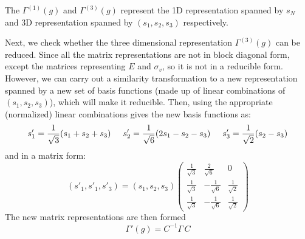 \documentclass[a4paper, 12pt, openany]{report}
\begin{document}
The $\Gamma^{(1)}(g)$ and $\Gamma^{(3)}(g)$ represent the 1D representation spanned by $s_N$ and 3D representation spanned by $(s_1, s_2, s_3)$ respectively.

 Next, we check whether the three dimensional representation $\Gamma^{(3)}(g)$  can be reduced. Since all the matrix representations are not in block diagonal form, except the matrices representing $E$ and $\sigma_v$, so it is not in a reducible form. However, we can carry out a similarity transformation to a new \break representation spanned by a new set of basis functions (made up of linear combinations of $(s_1, s_2, s_3)$), which will make it reducible. Then, using the appropriate (normalized) linear combinations gives the new basis functions as:
$$s'_1=\frac{1}{\sqrt{3}}(s_1+s_2+s_3)\hspace{0.5cm}s'_2=\frac{1}{\sqrt{6}}(2s_1-s_2-s_3)\hspace{0.5cm}s'_3=\frac{1}{\sqrt{2}}(s_2-s_3)$$
and in a matrix form:\\
 $$(s'_1, s'_1, s'_3)=(s_1, s_2, s_3)\begin{pmatrix}
 \frac{1}{\sqrt{3}}&\frac{2}{\sqrt{6}}&0\\\frac{1}{\sqrt{3}}&-\frac{1}{\sqrt{6}}&\frac{1}{\sqrt{2}}\\\frac{1}{\sqrt{3}}&-\frac{1}{\sqrt{6}}&\frac{1}{\sqrt{2}}\end{pmatrix}$$
 The new matrix representations are then formed $$\Gamma'(g)=C^{-1}\Gamma\,C$$
\end{document}
